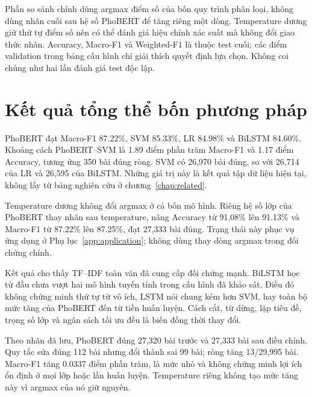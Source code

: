Phần so sánh chính dùng argmax điểm số của bốn quy trình phân loại, không dùng nhãn cuối sau hệ số PhoBERT để tăng riêng một dòng. Temperature dương giữ thứ tự điểm số nên có thể đánh giá hiệu chỉnh xác suất mà không đổi giao thức nhãn. Accuracy, Macro-F1 và Weighted-F1 là thuộc test cuối; các điểm validation trong bảng cấu hình chỉ giải thích quyết định lựa chọn. Không coi chúng như hai lần đánh giá test độc lập.

\FloatBarrier
\section{Kết quả tổng thể bốn phương pháp}

PhoBERT đạt Macro-F1 87.22\%, SVM 85.33\%, LR 84.98\% và BiLSTM 84.60\%. Khoảng cách PhoBERT--SVM là 1.89 điểm phần trăm Macro-F1 và 1.17 điểm Accuracy, tương ứng 350 bài đúng ròng. SVM có 26,970 bài đúng, so với 26,714 của LR và 26,595 của BiLSTM. Những giá trị này là kết quả tập dữ liệu hiện tại, không lấy từ bảng nghiên cứu ở chương~\ref{chap:related}.

Temperature dương không đổi argmax ở cả bốn mô hình. Riêng hệ số lớp của PhoBERT thay nhãn sau temperature, nâng Accuracy từ 91.08\% lên 91.13\% và Macro-F1 từ 87.22\% lên 87.25\%, đạt 27,333 bài đúng. Trạng thái này phục vụ ứng dụng ở Phụ lục~\ref{app:application}; không dùng thay dòng argmax trong đối chứng chính.

Kết quả cho thấy TF--IDF toàn văn đã cung cấp đối chứng mạnh. BiLSTM học từ đầu chưa vượt hai mô hình tuyến tính trong cấu hình đã khảo sát. Điều đó không chứng minh thứ tự từ vô ích, LSTM nói chung kém hơn SVM, hay toàn bộ mức tăng của PhoBERT đến từ tiền huấn luyện. Cách cắt, từ dừng, lặp tiêu đề, trọng số lớp và ngân sách tối ưu đều là biến đồng thời thay đổi.


\begin{table}[htbp]\centering\small\caption{PhoBERT trước/sau điều chỉnh theo lớp trên cùng test; chỉ số ở thang 0--1, chênh lệch là sau trừ trước.}\label{tab:pho_adjustment}
\end{table}
Theo nhãn đã lưu, PhoBERT đúng 27,320 bài trước và 27,333 bài sau điều chỉnh. Quy tắc sửa đúng 112 bài nhưng đổi thành sai 99 bài; ròng tăng 13/29,995 bài. Macro-F1 tăng 0.0337 điểm phần trăm, là mức nhỏ và không chứng minh lợi ích ổn định ở mọi lớp hoặc lần huấn luyện. Temperature riêng không tạo mức tăng này vì argmax của nó giữ nguyên.




